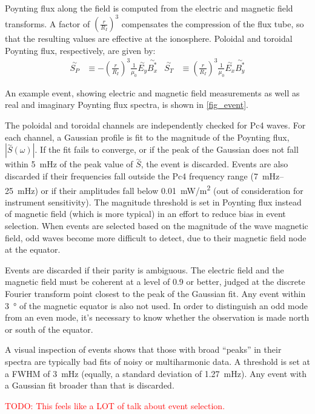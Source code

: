 \documentclass{article}
\newcommand{\dft}[1]{\ensuremath{\overset{\sim}{#1}}\xspace}
\newcommand{\todo}[1]{ \textcolor{red}{TODO: #1} }
\newcommand{\lr}[1]{ \left( #1 \right) }
\renewcommand{\arg}[1]{\!\lr{#1}}
\newcommand{\mz}{\ensuremath{\mu_0}\xspace}
\begin{document}
Poynting flux along the field is computed from the electric and magnetic field transforms. A factor of $\lr{\frac{r}{R_I}}^3$ compensates the compression of the flux tube, so that the resulting values are effective at the ionosphere. Poloidal and toroidal Poynting flux, respectively, are given by:
\begin{align}
  \dft{S_P} &\equiv -\lr{\frac{r}{R_I}}^3\frac{1}{\mz} \dft{E_y} \dft{B_x^*} &
  \dft{S_T} &\equiv  \lr{\frac{r}{R_I}}^3\frac{1}{\mz} \dft{E_x} \dft{B_y^*}
\end{align}

An example event, showing electric and magnetic field measurements as well as real and imaginary Poynting flux spectra, is shown in \cref{fig_event}.

The poloidal and toroidal channels are independently checked for Pc4 waves. For each channel, a Gaussian profile is fit to the magnitude of the Poynting flux, $|\dft{S}\arg{\omega}|$. If the fit fails to converge, or if the peak of the Gaussian does not fall within \SI{5}{\mHz} of the peak value of \dft{S}, the event is discarded. Events are also discarded if their frequencies fall outside the Pc4 frequency range (\SIrange{7}{25}{\mHz}) or if their amplitudes fall below \SI{0.01}{\mW/\m\squared} (out of consideration for instrument sensitivity). The magnitude threshold is set in Poynting flux instead of magnetic field (which is more typical) in an effort to reduce bias in event selection. When events are selected based on the magnitude of the wave magnetic field, odd waves become more difficult to detect, due to their magnetic field node at the equator\cite{dai_2015}.

Events are discarded if their parity is ambiguous. The electric field and the magnetic field must be coherent at a level of 0.9 or better, judged at the discrete Fourier transform point closest to the peak of the Gaussian fit. Any event within \SI{3}{\degree} of the magnetic equator is also not used. In order to distinguish an odd mode from an even mode, it's necessary to know whether the observation is made north or south of the equator.

A visual inspection of events shows that those with broad ``peaks'' in their spectra are typically bad fits of noisy or multiharmonic data. A threshold is set at a FWHM of \SI{3}{\mHz} (equally, a standard deviation of \SI{1.27}{\mHz}). Any event with a Gaussian fit broader than that is discarded.

\todo{This feels like a LOT of talk about event selection. }
\end{document}
